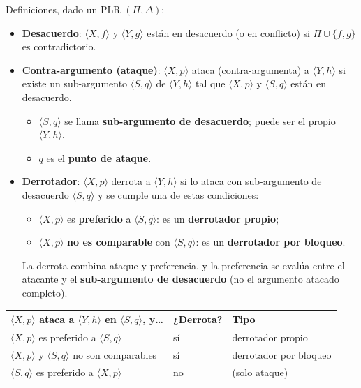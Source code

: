 \documentclass[11pt,a4paper]{article}
\begin{document}
Definiciones, dado un PLR $(\Pi, \Delta)$:
\begin{itemize}
  \item \textbf{Desacuerdo}: $\langle X, f\rangle$ y $\langle Y, g\rangle$ están en desacuerdo (o en conflicto) si $\Pi \cup \{f, g\}$ es contradictorio.
  \item \textbf{Contra-argumento (ataque)}: $\langle X, p\rangle$ ataca (contra-argumenta) a $\langle Y, h\rangle$ si existe un sub-argumento $\langle S, q\rangle$ de $\langle Y, h\rangle$ tal que $\langle X, p\rangle$ y $\langle S, q\rangle$ están en desacuerdo.
  \begin{itemize}
    \item $\langle S, q\rangle$ se llama \textbf{sub-argumento de desacuerdo}; puede ser el propio $\langle Y, h\rangle$.
    \item $q$ es el \textbf{punto de ataque}.
  \end{itemize}
  \item \textbf{Derrotador}: $\langle X, p\rangle$ derrota a $\langle Y, h\rangle$ si lo ataca con sub-argumento de desacuerdo $\langle S, q\rangle$ y se cumple una de estas condiciones:
  \begin{itemize}
    \item[(a)] $\langle X, p\rangle$ es \textbf{preferido} a $\langle S, q\rangle$: es un \textbf{derrotador propio};
    \item[(b)] $\langle X, p\rangle$ \textbf{no es comparable} con $\langle S, q\rangle$: es un \textbf{derrotador por bloqueo}.
  \end{itemize}
  La derrota combina ataque y preferencia, y la preferencia se evalúa entre el atacante y el \textbf{sub-argumento de desacuerdo} (no el argumento atacado completo).
\end{itemize}

\begin{center}
\small
\begin{tabular}{@{}l l l@{}}
\toprule
\textbf{$\langle X, p\rangle$ ataca a $\langle Y, h\rangle$ en $\langle S, q\rangle$, y\dots} & \textbf{¿Derrota?} & \textbf{Tipo} \\
\midrule
$\langle X, p\rangle$ es preferido a $\langle S, q\rangle$ & sí & derrotador propio \\
$\langle X, p\rangle$ y $\langle S, q\rangle$ no son comparables & sí & derrotador por bloqueo \\
$\langle S, q\rangle$ es preferido a $\langle X, p\rangle$ & no & (solo ataque) \\
\bottomrule
\end{tabular}
\end{center}
\end{document}
